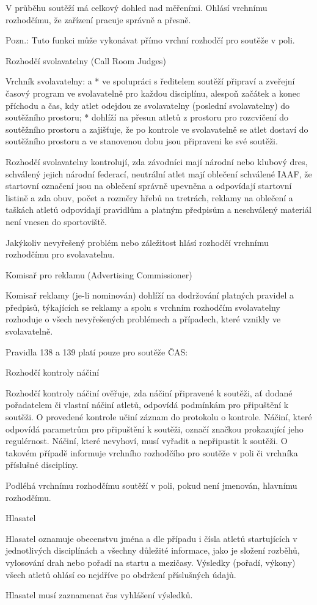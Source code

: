 V průběhu soutěží má celkový dohled nad měřeními.
Ohlásí vrchnímu rozhodčímu, že zařízení pracuje správně a přesně.

Pozn.: Tuto funkci může vykonávat přímo vrchní rozhodčí pro soutěže v poli.

\secc Rozhodčí svolavatelny (Call Room Judges)

Vrchník svolavatelny:
\begitems \style a
* ve spolupráci s ředitelem soutěží připraví a zveřejní časový program ve svolavatelně pro každou disciplínu, alespoň začátek a konec příchodu a čas, kdy atlet odejdou ze svolavatelny (poslední svolavatelny) do soutěžního prostoru;
* dohlíží na přesun atletů z prostoru pro rozcvičení do soutěžního prostoru a zajišťuje, že po kontrole ve svolavatelně se atlet dostaví do soutěžního prostoru a ve stanovenou dobu jsou připraveni ke své soutěži.
\enditems

Rozhodčí svolavatelny kontrolují, zda závodníci mají národní nebo klubový dres, schválený jejich národní federací, neutrální atlet mají oblečení schválené IAAF, že startovní označení jsou na oblečení správně upevněna a odpovídají startovní listině a zda obuv, počet a rozměry hřebů na tretrách, reklamy na oblečení a taškách atletů odpovídají pravidlům a platným předpisům a neschválený materiál není vnesen do sportoviště.

Jakýkoliv nevyřešený problém nebo záležitost hlásí rozhodčí vrchnímu rozhodčímu pro svolavatelnu.

\secc Komisař pro reklamu (Advertising Commissioner)

Komisař reklamy (je-li nominován) dohlíží na dodržování platných pravidel a předpisů, týkajících se reklamy a spolu s vrchním rozhodčím svolavatelny rozhoduje o všech nevyřešených problémech a případech, které vznikly ve svolavatelně.


Pravidla 138 a 139 platí pouze pro soutěže ČAS:

\secc Rozhodčí kontroly náčiní

Rozhodčí kontroly náčiní ověřuje, zda náčiní připravené k soutěži, ať dodané pořadatelem či vlastní náčiní atletů, odpovídá podmínkám pro připuštění k soutěži.
O provedené kontrole učiní záznam do protokolu o kontrole.
Náčiní, které odpovídá parametrům pro připuštění k soutěži, označí značkou prokazující jeho regulérnost.
Náčiní, které nevyhoví, musí vyřadit a nepřipustit k soutěži.
O takovém případě informuje vrchního rozhodčího pro soutěže v poli či vrchníka příslušné disciplíny.

Podléhá vrchnímu rozhodčímu soutěží v poli, pokud není jmenován, hlavnímu rozhodčímu.

\secc Hlasatel

Hlasatel oznamuje obecenstvu jména a dle případu i čísla atletů startujících v jednotlivých disciplínách a všechny důležité informace, jako je složení rozběhů, vylosování drah nebo pořadí na startu a mezičasy.
Výsledky (pořadí, výkony) všech atletů ohlásí co nejdříve po obdržení příslušných údajů.

Hlasatel musí zaznamenat čas vyhlášení výsledků.

\endinput